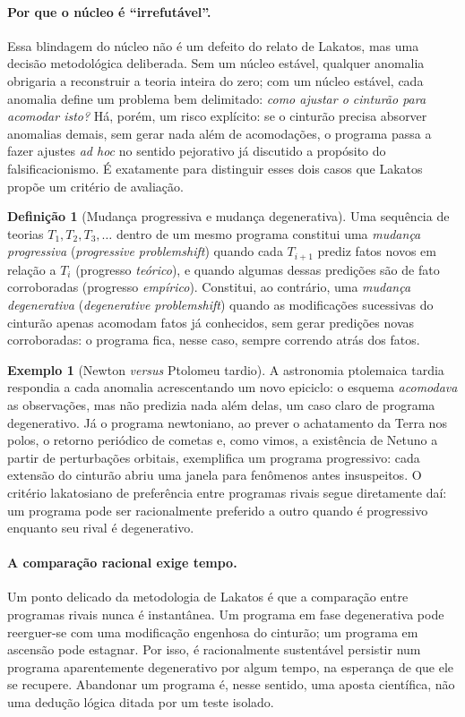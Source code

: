 \documentclass[9pt,a4paper]{extarticle}
\newcommand{\impt}[1]{\textcolor{important}{#1}}
\theoremstyle{definition}
\newtheorem{definition}{Definição}[section]
\newtheorem{example}{Exemplo}[section]
\begin{document}
\paragraph{Por que o núcleo é ``irrefutável''.}
Essa blindagem do núcleo não é um defeito do relato de Lakatos, mas uma decisão metodológica deliberada. Sem um núcleo estável, qualquer anomalia obrigaria a reconstruir a teoria inteira do zero; com um núcleo estável, cada anomalia define um problema bem delimitado: \emph{como ajustar o cinturão para acomodar isto?} Há, porém, um risco explícito: se o cinturão precisa absorver anomalias demais, sem gerar nada além de acomodações, o programa passa a fazer ajustes \emph{ad hoc} no sentido pejorativo já discutido a propósito do falsificacionismo. É exatamente para distinguir esses dois casos que Lakatos propõe um critério de avaliação.

\begin{definition}[Mudança progressiva e mudança degenerativa]
Uma sequência de teorias $T_1, T_2, T_3, \ldots$ dentro de um mesmo programa constitui uma \emph{mudança progressiva} (\emph{progressive problemshift}) quando cada $T_{i+1}$ prediz fatos novos em relação a $T_i$ (progresso \emph{teórico}), e quando algumas dessas predições são de fato corroboradas (progresso \emph{empírico}). Constitui, ao contrário, uma \emph{mudança degenerativa} (\emph{degenerative problemshift}) quando as modificações sucessivas do cinturão apenas acomodam fatos já conhecidos, sem gerar predições novas corroboradas: o programa fica, nesse caso, sempre correndo atrás dos fatos.
\end{definition}

\begin{example}[Newton \emph{versus} Ptolomeu tardio]
A astronomia ptolemaica tardia respondia a cada anomalia acrescentando um novo epiciclo: o esquema \emph{acomodava} as observações, mas não predizia nada além delas, um caso claro de programa degenerativo. Já o programa newtoniano, ao prever o achatamento da Terra nos polos, o retorno periódico de cometas e, como vimos, a existência de Netuno a partir de perturbações orbitais, exemplifica um programa \impt{progressivo}: cada extensão do cinturão abriu uma janela para fenômenos antes insuspeitos. O critério lakatosiano de preferência entre programas rivais segue diretamente daí: um programa pode ser racionalmente preferido a outro quando é progressivo enquanto seu rival é degenerativo.
\end{example}

\paragraph{A comparação racional exige tempo.}
Um ponto delicado da metodologia de Lakatos é que a comparação entre programas rivais nunca é instantânea. Um programa em fase degenerativa pode reerguer-se com uma modificação engenhosa do cinturão; um programa em ascensão pode estagnar. Por isso, é racionalmente sustentável persistir num programa aparentemente degenerativo por algum tempo, na esperança de que ele se recupere. Abandonar um programa é, nesse sentido, uma \impt{aposta científica}, não uma dedução lógica ditada por um teste isolado.
\end{document}
